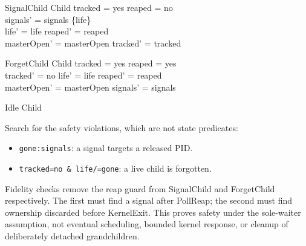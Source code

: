 \documentclass[a4paper,10pt]{article}
\begin{document}
\begin{schema}{SignalChild}
\Delta Child
\where
tracked = yes \land reaped = no \\
signals' = signals \cup \{life\} \\
life' = life \land reaped' = reaped \\
masterOpen' = masterOpen \land tracked' = tracked
\end{schema}
\begin{schema}{ForgetChild}
\Delta Child
\where
tracked = yes \land reaped = yes \\
tracked' = no \land life' = life \land reaped' = reaped \\
masterOpen' = masterOpen \land signals' = signals
\end{schema}
\begin{schema}{Idle}
\Xi Child
\end{schema}

Search for the safety violations, which are not state predicates:
\begin{itemize}
\item \texttt{gone:signals}: a signal targets a released PID.
\item \texttt{tracked=no \& life/=gone}: a live child is forgotten.
\end{itemize}

Fidelity checks remove the reap guard from SignalChild and ForgetChild
respectively. The first must find a signal after PollReap; the second must
find ownership discarded before KernelExit. This proves safety under the
sole-waiter assumption, not eventual scheduling, bounded kernel response,
or cleanup of deliberately detached grandchildren.
\end{document}
